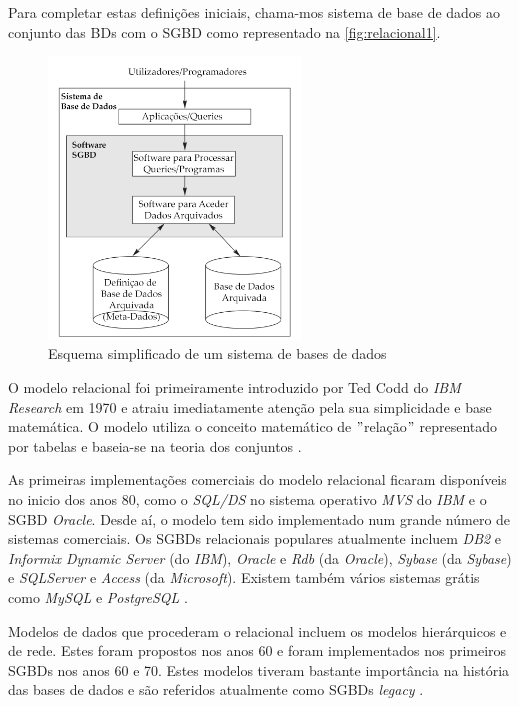 \documentclass[11pt,twoside,a4paper]{report}
\begin{document}
Para completar estas definições iniciais, chama-mos sistema de base de dados ao conjunto das BDs com o SGBD como representado na \autoref{fig:relacional1}.
\begin{figure}[H]
	\begin{center}
		\includegraphics[width=0.6\textwidth]{SGBD} %
		\caption[Esquema de um sistema de bases de dados]{Esquema simplificado de um sistema de bases de dados \cite{Elmasri:2010:FDS:1855347}}
		\label{fig:relacional1}
	\end{center}
\end{figure}
O modelo relacional foi primeiramente introduzido por Ted Codd do \textit{IBM Research} em 1970 \cite{Elmasri:2010:FDS:1855347,Codd} e atraiu imediatamente atenção pela sua simplicidade e base matemática. O modelo utiliza o conceito matemático de $ " $relação$ " $ representado por tabelas e baseia-se na teoria dos conjuntos \cite{Elmasri:2010:FDS:1855347}.\par
As primeiras implementações comerciais do modelo relacional ficaram disponíveis no inicio dos anos 80, como o \textit{SQL/DS} no sistema operativo \textit{MVS} do \textit{IBM} e o SGBD \textit{Oracle}. Desde aí, o modelo tem sido implementado num grande número de sistemas comerciais. Os SGBDs relacionais populares atualmente incluem \textit{DB2} e \textit{Informix Dynamic Server} (do \textit{IBM}), \textit{Oracle} e \textit{Rdb} (da \textit{Oracle}), \textit{Sybase} (da \textit{Sybase}) e \textit{SQLServer} e \textit{Access} (da \textit{Microsoft}). Existem também vários sistemas grátis como \textit{MySQL} e \textit{PostgreSQL} \cite{Elmasri:2010:FDS:1855347}.\par
Modelos de dados que procederam o relacional incluem os modelos hierárquicos e de rede. Estes foram propostos nos anos 60 e foram implementados nos primeiros SGBDs nos anos 60 e 70. Estes modelos tiveram bastante importância na história das bases de dados e são referidos atualmente como SGBDs \textit{legacy} \cite{Elmasri:2010:FDS:1855347}.
\end{document}
